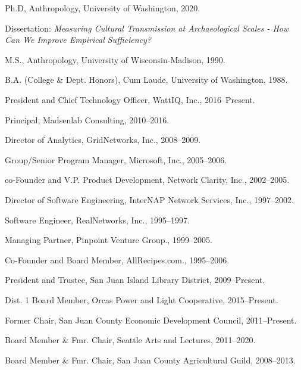 \documentclass[11pt,article,oneside]{memoir}
\begin{document}

\ind Ph.D, Anthropology, University of Washington, 2020.

\ind \hspace{0.35in} \footnotesize Dissertation: \emph{Measuring Cultural Transmission at Archaeological Scales - How Can We Improve Empirical Sufficiency?} \normalsize \vspace{0.02in}

\ind M.S., Anthropology, University of Wisconsin-Madison, 1990. \normalsize \vspace{0.01in}

\ind B.A. (College \& Dept. Honors), Cum Laude, University of Washington, 1988.

\bigskip

{}

\ind President and Chief Technology Officer, WattIQ, Inc., 2016--Present.      

\ind Principal, Madsenlab Consulting, 2010--2016.

\ind Director of Analytics, GridNetworks, Inc., 2008--2009.

\ind Group/Senior Program Manager, Microsoft, Inc., 2005--2006.

\ind co-Founder and V.P. Product Development, Network Clarity, Inc., 2002--2005.

\ind Director of Software Engineering, InterNAP Network Services, Inc., 1997--2002.

\ind Software Engineer, RealNetworks, Inc., 1995--1997.

\ind Managing Partner, Pinpoint Venture Group., 1999--2005.

\ind Co-Founder and Board Member, AllRecipes.com., 1995--2006.

\bigskip


\ind President and Trustee, San Juan Island Library District, 2009--Present.

\ind Dist. 1 Board Member, Orcas Power and Light Cooperative, 2015--Present.

\ind Former Chair, San Juan County Economic Development Council, 2011--Present.

\ind Board Member \& Fmr. Chair, Seattle Arts and Lectures, 2011--2020.

\ind Board Member \& Fmr. Chair, San Juan County Agricultural Guild, 2008--2013.
\end{document}
